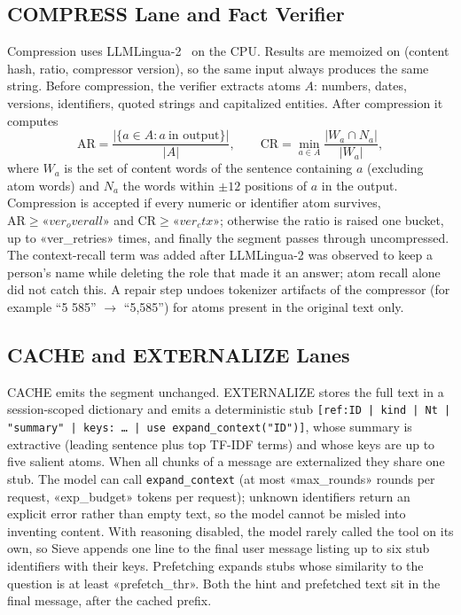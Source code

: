 \documentclass[journal]{IEEEtran}
\begin{document}
\subsection{COMPRESS Lane and Fact Verifier}
Compression uses LLMLingua-2~\cite{pan2024llmlingua2} on the CPU. Results are memoized on (content hash, ratio, compressor
version), so the same input always produces the same string. Before compression, the verifier extracts atoms $A$: numbers, dates,
versions, identifiers, quoted strings and capitalized entities. After compression it computes
\begin{equation}
\mathrm{AR}=\frac{|\{a\in A: a\ \text{in output}\}|}{|A|},\qquad
\mathrm{CR}=\min_{a\in A}\frac{|W_a\cap N_a|}{|W_a|},
\label{eq:verify}
\end{equation}
where $W_a$ is the set of content words of the sentence containing $a$ (excluding atom words) and $N_a$ the words within $\pm12$
positions of $a$ in the output. Compression is accepted if every numeric or identifier atom survives, $\mathrm{AR}\ge«ver_overall»$ and
$\mathrm{CR}\ge«ver_ctx»$; otherwise the ratio is raised one bucket, up to «ver_retries» times, and finally the segment passes through
uncompressed. The context-recall term was added after LLMLingua-2 was observed to keep a person's name while deleting the role
that made it an answer; atom recall alone did not catch this. A repair step undoes tokenizer artifacts of the compressor (for
example ``5 585'' $\rightarrow$ ``5,585'') for atoms present in the original text only.

\subsection{CACHE and EXTERNALIZE Lanes}
CACHE emits the segment unchanged. EXTERNALIZE stores the full text in a session-scoped dictionary and emits a deterministic stub
\texttt{[ref:ID | kind | Nt | "summary" | keys: \dots{} | use expand\_context("ID")]}, whose summary is extractive (leading sentence
plus top TF-IDF terms) and whose keys are up to five salient atoms. When all chunks of a message are externalized they share one
stub. The model can call \texttt{expand\_context} (at most «max_rounds» rounds per request, «exp_budget» tokens per request); unknown
identifiers return an explicit error rather than empty text, so the model cannot be misled into inventing content. With reasoning
disabled, the model rarely called the tool on its own, so Sieve appends one line to the final user message listing up to six stub
identifiers with their keys. Prefetching expands stubs whose similarity to the question is at least «prefetch_thr». Both the hint
and prefetched text sit in the final message, after the cached prefix.
\end{document}
